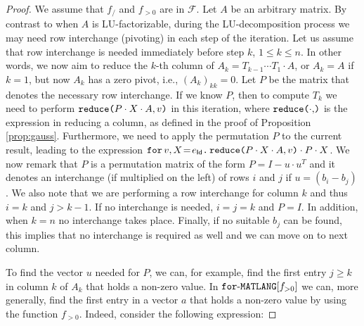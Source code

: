 \begin{proof}

    We assume that $f_{/}$ and $f_{>0}$ are in $\mathcal{F}$. Let $A$ be an arbitrary matrix.
    By contrast to when $A$ is LU-factorizable, during the LU-decomposition process we may need row interchange (pivoting) in each step of the iteration. Let us assume that row interchange is needed immediately before 
    step $k$, $1\leq k\leq n$. In other words, we now aim to reduce the $k$-th column of $A_k=T_{k-1}\cdots T_1\cdot A$, 
    or $A_k=A$ if $k=1$, but now $A_k$ has a zero pivot, i.e., $(A_{k})_{kk}=0$. 
    Let $P$ be the matrix that denotes the necessary row interchange. If we know
    $P$, then 
    to compute $T_k$ we need to perform $\red{P\cdot X\cdot A}{v}$ in this iteration,
    where $\red{\cdot}$ is the expression in \langfor reducing a column, as defined in the proof of Proposition \ref{prop:gauss}.
    Furthermore, we need to apply the permutation $P$ to the current result, leading to the 
    expression $\initf{e_{\mathsf{Id}}}{v}{X}{\red{P\cdot X\cdot A}{v}\cdot P\cdot X}$. We now remark that
    $P$ is a permutation matrix of the  form $P = I - u\cdot u^T$ and it denotes an interchange (if multiplied on the left) of rows $i$ and $j$ if $u=(b_{i}-b_{j})$. We also note that we are performing a row interchange for column $k$ and thus $i=k$ and $j>k-1$. If no interchange is needed, $i=j=k$ and $P=I$.
    In addition, when $k=n$ no interchange takes place. Finally, if no suitable $b_j$ can
    be found, this implies that no interchange is required as well and we can move on to next column.

    To find the vector $u$ needed for $P$, we can, for example, find the first entry $j\geq k$ in column $k$ of $A_k$ that holds a non-zero value. In $\langforf{f_{>0}}$  we can, more generally, find the first entry in a vector $a$ that holds a non-zero value by using the function $f_{>0}$. Indeed, consider the following expression:


\end{proof}
